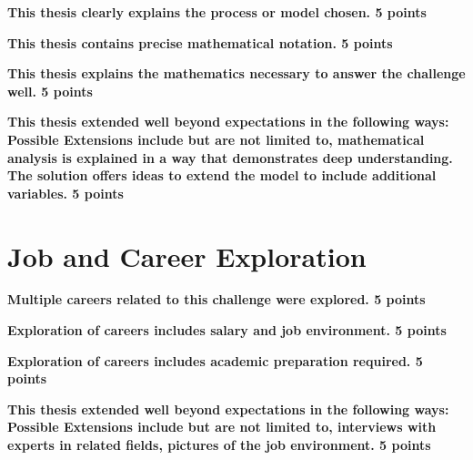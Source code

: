 \textbf{This thesis clearly explains the process or model chosen. 5 points}

\textbf{This thesis contains precise mathematical notation. 5 points}

\textbf{This thesis explains the mathematics necessary to answer the challenge well. 5 points}

\textbf{This thesis extended well beyond expectations in the following ways: Possible Extensions include but are not limited to, mathematical analysis is explained in a way that demonstrates deep understanding. The solution offers ideas to extend the model to include additional variables. 5 points}

\section{Job and Career Exploration}

\textbf{Multiple careers related to this challenge were explored. 5 points}

\textbf{Exploration of careers includes salary and job environment. 5 points}

\textbf{Exploration of careers includes academic preparation required. 5 points}

\textbf{This thesis extended well beyond expectations in the following ways: Possible Extensions include but are not limited to, interviews with experts in related fields, pictures of the job environment. 5 points}

